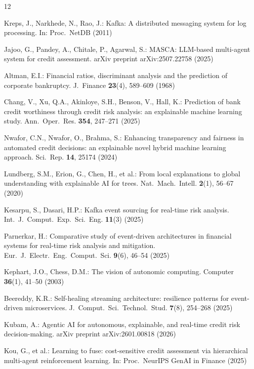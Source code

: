 \documentclass[runningheads]{llncs}
\begin{document}
\enlargethispage{2\baselineskip}
\begin{thebibliography}{12}\footnotesize
\setlength{\itemsep}{0pt plus 0.1pt}
\setlength{\parskip}{0pt}

Kreps, J., Narkhede, N., Rao, J.: Kafka: A distributed messaging system for log processing. In: Proc.~NetDB (2011)

Jajoo, G., Pandey, A., Chitale, P., Agarwal, S.: MASCA: LLM-based multi-agent system for credit assessment. arXiv preprint arXiv:2507.22758 (2025)

Altman, E.I.: Financial ratios, discriminant analysis and the prediction of corporate bankruptcy. J.~Finance \textbf{23}(4), 589--609 (1968)

Chang, V., Xu, Q.A., Akinloye, S.H., Benson, V., Hall, K.: Prediction of bank credit worthiness through credit risk analysis: an explainable machine learning study. Ann.~Oper.~Res. \textbf{354}, 247--271 (2025)

Nwafor, C.N., Nwafor, O., Brahma, S.: Enhancing transparency and fairness in automated credit decisions: an explainable novel hybrid machine learning approach. Sci.~Rep. \textbf{14}, 25174 (2024)

Lundberg, S.M., Erion, G., Chen, H., et al.: From local explanations to global understanding with explainable AI for trees. Nat.~Mach.~Intell. \textbf{2}(1), 56--67 (2020)

Kesarpu, S., Dasari, H.P.: Kafka event sourcing for real-time risk analysis. Int.~J.~Comput.~Exp.~Sci.~Eng. \textbf{11}(3) (2025)

Parnerkar, H.: Comparative study of event-driven architectures in financial systems for real-time risk analysis and mitigation. Eur.~J.~Electr.~Eng.~Comput.~Sci. \textbf{9}(6), 46--54 (2025)

Kephart, J.O., Chess, D.M.: The vision of autonomic computing. Computer \textbf{36}(1), 41--50 (2003)

Beereddy, K.R.: Self-healing streaming architecture: resilience patterns for event-driven microservices. J.~Comput.~Sci.~Technol.~Stud. \textbf{7}(8), 254--268 (2025)

Kubam, A.: Agentic AI for autonomous, explainable, and real-time credit risk decision-making. arXiv preprint arXiv:2601.00818 (2026)

Kou, G., et al.: Learning to fuse: cost-sensitive credit assessment via hierarchical multi-agent reinforcement learning. In: Proc.~NeurIPS GenAI in Finance (2025)

\end{thebibliography}
\end{document}
